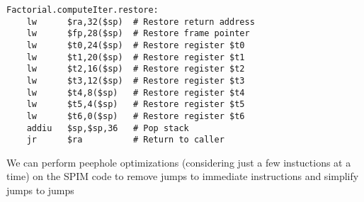 \documentclass[8pt,a4paper,compress]{beamer}
\begin{document}
\begin{frame}[fragile]
\begin{lstlisting}[language={},style=focusin]
Factorial.computeIter.restore:                                                                                                                                                                                                                
    lw      $ra,32($sp)  # Restore return address                                                                                                                                                                                             
    lw      $fp,28($sp)  # Restore frame pointer                                                                                                                                                                                              
    lw      $t0,24($sp)  # Restore register $t0
    lw      $t1,20($sp)  # Restore register $t1                                                                                                                                                                                               
    lw      $t2,16($sp)  # Restore register $t2
    lw      $t3,12($sp)  # Restore register $t3                                                                                                                                                                                               
    lw      $t4,8($sp)   # Restore register $t4
    lw      $t5,4($sp)   # Restore register $t5                                                                                                                                                                                               
    lw      $t6,0($sp)   # Restore register $t6
    addiu   $sp,$sp,36   # Pop stack
    jr      $ra          # Return to caller
\end{lstlisting}

\pause
\bigskip

We can perform peephole optimizations (considering just a few instuctions at a time) on the SPIM code to remove jumps to immediate instructions and simplify jumps to jumps
\end{frame}
\end{document}
